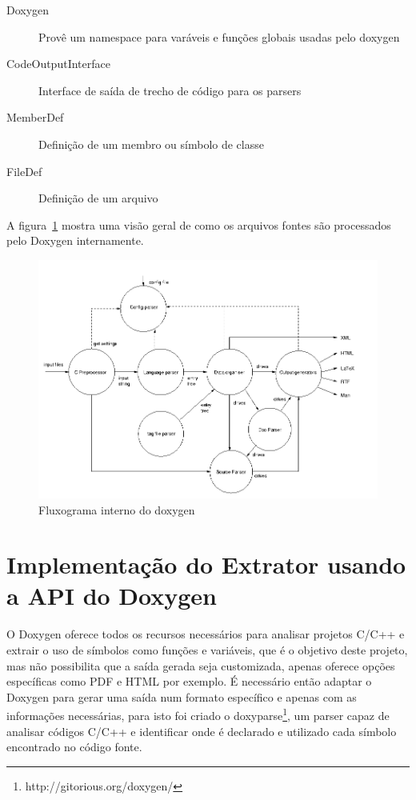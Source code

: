 \begin{description}
\item[Doxygen] Provê um namespace para varáveis e funções globais usadas pelo doxygen
\item[CodeOutputInterface] Interface de saída de trecho de código para os parsers
\item[MemberDef] Definição de um membro ou símbolo de classe
\item[FileDef] Definição de um arquivo
\end{description}

A figura~\ref{fig:doxygen-internals-flow} mostra uma visão geral de como os
arquivos fontes são processados pelo Doxygen internamente.

\begin{figure}[h]
\center
\includegraphics[scale=0.5]{imagens/doxygen-internals-flow}
\caption{Fluxograma interno do doxygen\cite{doxygenInternals}}
\label{fig:doxygen-internals-flow}
\end{figure}

\section{Implementação do Extrator usando a API do Doxygen}

O Doxygen oferece todos os recursos necessários para analisar projetos C/C++ e
extrair o uso de símbolos como funções e variáveis, que é o objetivo deste
projeto, mas não possibilita que a saída gerada seja customizada, apenas
oferece opções específicas como PDF e HTML por exemplo. É necessário então
adaptar o Doxygen para gerar uma saída num formato específico e apenas com as
informações necessárias, para isto foi criado o
doxyparse\footnote{http://gitorious.org/doxygen/}, um parser capaz de analisar
códigos C/C++ e identificar onde é declarado e utilizado cada símbolo
encontrado no código fonte.

